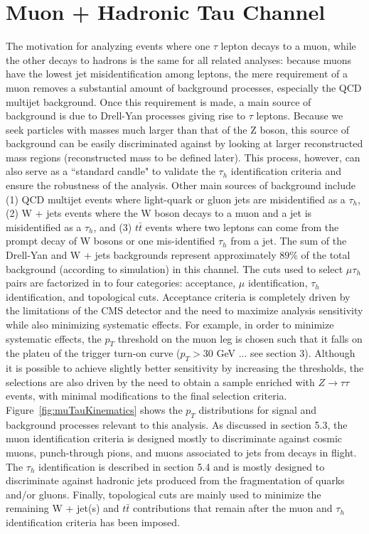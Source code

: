 \chapter{Muon + Hadronic Tau Channel}\label{sec:muTauhad}

The motivation for analyzing events where one $\tau$ lepton decays to a muon,
while the other decays to hadrons is the same for all \ditau related analyses: because
muons have the lowest jet misidentification among leptons, the mere requirement of a
muon removes a substantial amount of background processes, especially the QCD multijet background. Once this requirement
is made, a main source of background is due to Drell-Yan
processes giving rise to $\tau$ leptons. Because we seek particles with masses
much larger than that of the Z boson, this source of background can be easily discriminated
against by looking at larger reconstructed \ditau mass regions (reconstructed mass to be defined later). This process,
however, can also serve as a ``standard candle" to validate the $\tau_{h}$ identification criteria and
ensure the robustness of the analysis. Other main sources 
of background include (1) QCD multijet events where light-quark or gluon jets are misidentified 
as a $\tau_{h}$, (2) W + jets events where the W boson decays to a muon and a jet is
misidentified as a $\tau_{h}$, and (3) $t\bar{t}$ events where two leptons can
come from the prompt decay of W bosons or one mis-identified $\tau_{h}$ from a jet. The sum of the Drell-Yan and W + jets backgrounds represent 
approximately $89$\% of the total background (according to simulation) in this channel.  The 
cuts used to select $\mu\tau_{h}$ pairs are factorized in to four categories: acceptance, 
$\mu$ identification, $\tau_{h}$ identification, and topological cuts. Acceptance criteria is completely
driven by the limitations of the CMS detector and the need to maximize analysis
sensitivity while also minimizing systematic effects. For example, in order to minimize systematic effects, the
$p_{T}$ threshold on the muon leg is chosen such that it falls on the plateu of the trigger turn-on curve ($p_{T} > 30$ GeV ... see section 3). 
Although it is possible to achieve slightly better sensitivity by increasing the thresholds,
the selections are also driven by the need to obtain a sample enriched with $Z\to\tau\tau$ events, 
with minimal modifications to the final selection criteria. 
Figure~\ref{fig:muTauKinematics} shows 
the $p_{T}$ distributions for signal and background processes relevant to this analysis. 
As discussed in section 5.3, the muon identification criteria is designed mostly to discriminate
against cosmic muons, punch-through pions, and muons associated to jets 
from decays in flight. The $\tau_{h}$ identification is described in section 5.4 and is mostly designed to
discriminate against hadronic jets produced from the fragmentation of quarks and/or
gluons. Finally, topological cuts are mainly used to minimize the remaining W + jet(s)
and $t\bar{t}$ contributions that remain after the muon and $\tau_{h}$ identification criteria has been
imposed. 

